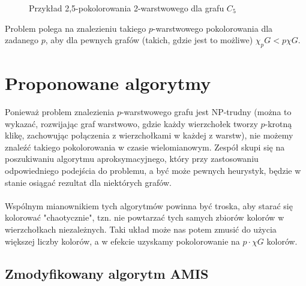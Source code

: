 \documentclass[10pt,a4paper]{article}
\begin{document}
	\begin{figure}[H]
		\centering
		\caption{Przykład 2,5-pokolorowania 2-warstwowego dla grafu $C_{5}$}
	\end{figure}
	
	Problem polega na znalezieniu takiego $p$-warstwowego pokolorowania dla zadanego $p$, aby dla pewnych grafów (takich, gdzie jest to możliwe) $\chi_{p}G < p \chi G$.
	
	\section{Proponowane algorytmy}
	
	Ponieważ problem znalezienia $p$-warstwowego grafu jest NP-trudny (można to wykazać, rozwijając graf warstwowo, gdzie każdy wierzchołek tworzy $p$-krotną klikę, zachowując połączenia z wierzchołkami w każdej z warstw), nie możemy znaleźć takiego pokolorowania w czasie wielomianowym. Zespół skupi się na poszukiwaniu algorytmu aproksymacyjnego, który przy zastosowaniu odpowiedniego podejścia do problemu, a być może pewnych heurystyk, będzie w stanie osiągać rezultat dla niektórych grafów.
	\\~\\
	Wspólnym mianownikiem tych algorytmów powinna być troska, aby starać się kolorować "chaotycznie", tzn. nie powtarzać tych samych zbiorów kolorów w wierzchołkach niezależnych. Taki układ może nas potem zmusić do użycia większej liczby kolorów, a w efekcie uzyskamy pokolorowanie na $p \cdot \chi G$ kolorów.
	
	\subsection{Zmodyfikowany algorytm AMIS}
	
\end{document}
